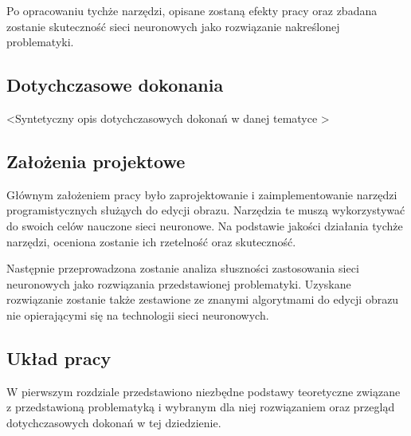     Po opracowaniu tychże narzędzi, opisane zostaną efekty pracy oraz
    zbadana zostanie skuteczność sieci neuronowych jako rozwiązanie nakreślonej
    problematyki.

  \subsection{Dotychczasowe dokonania}
    \textless Syntetyczny opis dotychczasowych dokonań w danej tematyce
    \textgreater

  \subsection{Założenia projektowe}
    Głównym założeniem pracy było zaprojektowanie i zaimplementowanie
    narzędzi programistycznych służąych do edycji obrazu. Narzędzia te muszą
    wykorzystywać do swoich celów nauczone sieci neuronowe. Na podstawie jakości
    działania tychże narzędzi, oceniona zostanie ich rzetelność oraz skuteczność.

    Następnie przeprowadzona zostanie analiza słuszności zastosowania sieci
    neuronowych jako rozwiązania przedstawionej problematyki. Uzyskane
    rozwiązanie zostanie także zestawione ze znanymi algorytmami do edycji
    obrazu nie opierającymi się na technologii sieci neuronowych.

  \subsection{Układ pracy}
    W pierwszym rozdziale przedstawiono niezbędne podstawy teoretyczne związane
    z przedstawioną problematyką i wybranym dla niej rozwiązaniem oraz przegląd
    dotychczasowych dokonań w tej dziedzienie.

